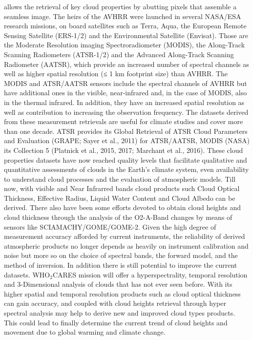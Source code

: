 \documentclass{scrartcl}
\newcommand{\whocares}{WHO$_2$CARES }
\begin{document}
allows the retrieval of key cloud properties by abutting pixels that assemble a
seamless image. The heirs of the AVHRR were launched in several NASA/ESA
research missions, on board satellites such as Terra, Aqua, the European Remote
Sensing Satellite (ERS-1/2) and the Environmental Satellite (Envisat). Those are
the Moderate Resolution imaging Spectroradiometer (MODIS), the Along-Track
Scanning Radiometers (ATSR-1/2) and the Advanced Along-Track Scanning Radiometer
(AATSR), which provide an increased number of spectral channels as well as
higher spatial resolution (≤ 1 km footprint size) than AVHRR. The MODIS and
ATSR/AATSR sensors include the spectral channels of AVHRR but have additional
ones in the visible, near-infrared and, in the case of MODIS, also in the
thermal infrared. In addition, they have an increased spatial resolution as well
as contribution to increasing the observation frequency. The datasets derived
from these measurement retrievals are useful for climate studies and cover more
than one decade. ATSR provides its Global Retrieval of ATSR Cloud Parameters and
Evaluation (GRAPE; Sayer et al., 2011) for ATSR/AATSR, MODIS (NASA) its
Collection 5 (Platnick et al., 2015, 2017; Marchant et al., 2016). These cloud
properties datasets have now reached quality levels that facilitate qualitative
and quantitative assessments of clouds in the Earth’s climate system, even
availability to understand cloud processes and the evaluation of atmospheric
models. Till now, with visible and Near Infrarred bands cloud products such
Cloud Optical Thickness, Effective Radius, Liquid Water Content and Cloud Albedo
can be derived. There also have been some efforts devoted to obtain cloud
heights and cloud thickness through the analysis of the O2-A-Band changes by
means of sensors like SCIAMACHY/GOME/GOME-2. Given the high degree of
measurement accuracy afforded by current instruments, the reliability of derived
atmospheric products no longer depends as heavily on instrument calibration and
noise but more so on the choice of spectral bands, the forward model, and the
method of inversion. In addition there is still potential to improve the current
datasets. \whocares mission will offer a hyperspectrality, temporal resolution
and 3-Dimensional analysis of clouds that has not ever seen before. With its
higher spatial and temporal resolution products such as cloud optical thickness
can gain accuracy, and coupled with cloud heights retrieval through hyper
spectral analysis may help to derive new and improved cloud types products. This
could lead to finally determine the current trend of cloud heights and movement
due to global warming and climate change.
\end{document}
